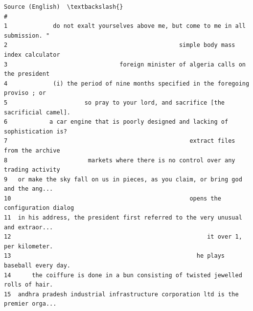 \documentclass[12pt,a4paper,oneside]{report}
\begin{document}
\begin{Verbatim}[commandchars=\\\{\},breaklines=true,breakanywhere=true,fontsize=\scriptsize,frame=leftline,framesep=2mm,rulecolor=\color{gray}]
                                                                   Source (English)  \textbackslash{}
#
1             do not exalt yourselves above me, but come to me in all submission. "
2                                                 simple body mass index calculator
3                                foreign minister of algeria calls on the president
4             (i) the period of nine months specified in the foregoing proviso ; or
5                      so pray to your lord, and sacrifice [the sacrificial camel].
6            a car engine that is poorly designed and lacking of sophistication is?
7                                                    extract files from the archive
8                       markets where there is no control over any trading activity
9   or make the sky fall on us in pieces, as you claim, or bring god and the ang...
10                                                   opens the configuration dialog
11  in his address, the president first referred to the very unusual and extraor...
12                                                        it over 1, per kilometer.
13                                                     he plays baseball every day.
14      the coiffure is done in a bun consisting of twisted jewelled rolls of hair.
15  andhra pradesh industrial infrastructure corporation ltd is the premier orga...


\end{Verbatim}
\end{document}

